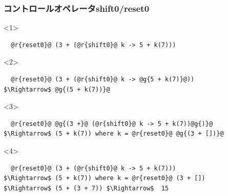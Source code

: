 \documentclass[dvipdfmx,cjk,xcolor=dvipsnames,envcountsect,notheorems,12pt,handout]{beamer} \usepackage{pgfpages} \pgfpagesuselayout{4 on 1}[a4paper,landscape,border shrink=5mm]
\theoremstyle{definition}
\begin{document}
\begin{frame}[fragile]
  \frametitle{コントロールオペレータshift0/reset0}
  \begin{onlyenv}<1>
\begin{lstlisting}
  @r{reset0}@ (3 + (@r{shift0}@ k -> 5 + k(7)))

\end{lstlisting}
  \end{onlyenv}

  \begin{onlyenv}<2>
\begin{lstlisting}
  @r{reset0}@ (3 + (@r{shift0}@ k -> @g{5 + k(7)}@))
$\Rightarrow$ @g{(5 + k(7))}@

\end{lstlisting}
  \end{onlyenv}

  \begin{onlyenv}<3>
\begin{lstlisting}
  @r{reset0}@ @g{(3 +}@ (@r{shift0}@ k -> 5 + k(7))@g{)}@
$\Rightarrow$ (5 + k(7)) where k = @r{reset0}@ @g{(3 + [])}@

\end{lstlisting}
  \end{onlyenv}

  \begin{onlyenv}<4>
\begin{lstlisting}
  @r{reset0}@ (3 + (@r{shift0}@ k -> 5 + k(7)))
$\Rightarrow$ (5 + k(7)) where k = @r{reset0}@ (3 + [])
$\Rightarrow$ (5 + (3 + 7)) $\Rightarrow$  15
\end{lstlisting}
  \end{onlyenv}


\end{frame}
\end{document}
